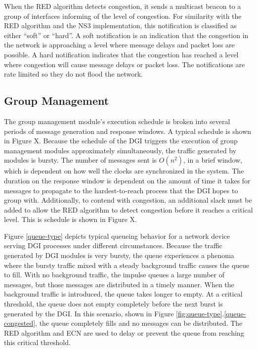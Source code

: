 When the RED algorithm detects congestion, it sends a multicast beacon to a group of interfaces informing of the level of congestion.
For similarity with the RED algorithm and the NS3 implementation, this notification is classified as either ``soft'' or ``hard''.
A soft notification is an indication that the congestion in the network is approaching a level where message delays and packet loss are possible.
A hard notification indicates that the congestion has reached a level where congestion will cause message delays or packet loss.
The notifications are rate limited so they do not flood the network.

\subsection{Group Management}

The group management module's execution schedule is broken into several periods of message generation and response windows.
A typical schedule is shown in Figure X.
Because the schedule of the DGI triggers the execution of group management modules approximately simultaneously, the traffic generated by modules is bursty.
The number of messages sent is $O(n^2)$, in a brief window, which is dependent on how well the clocks are synchronized in the system.
The duration on the response window is dependent on the amount of time it takes for messages to propagate to the hardest-to-reach process that the DGI hopes to group with.
Additionally, to contend with congestion, an additional slack must be added to allow the RED algorithm to detect congestion before it reaches a critical level.
This is schedule is shown in Figure X.

Figure \ref{queue-type} depicts typical queueing behavior for a network device serving DGI processes under different circumstances.
Because the traffic generated by DGI modules is very bursty, the queue experiences a phenoma where the bursty traffic mixed with a steady background traffic causes the queue to fill.
With no background traffic, the impulse queues a large number of messages, but those messages are distributed in a timely manner.
When the background traffic is introduced, the queue takes longer to empty.
At a critical threshold, the queue does not empty completely before the next burst is generated by the DGI.
In this scenario, shown in Figure \ref{fig:queue-type}.\ref{queue-congested}, the queue completely fills and no messages can be distributed.
The RED algorithm and ECN are used to delay or prevent the queue from reaching this critical threshold.

